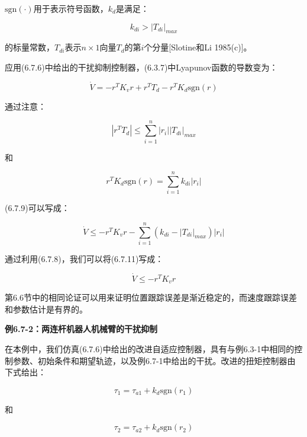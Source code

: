 \documentclass[12pt,a4paper]{ctexart}
\begin{document}
$\text{sgn}(\cdot)$用于表示符号函数，$k_d$是满足：

\begin{equation}\label{eq:kd-condition}
k_{di} > |T_{di}|_{max}
\end{equation}

的标量常数，$T_{di}$表示$n \times 1$向量$T_d$的第$i$个分量[Slotine和Li 1985(c)]。

应用(6.7.6)中给出的干扰抑制控制器，(6.3.7)中Lyapunov函数的导数变为：

\begin{equation}\label{eq:lyapunov-rejection}
\dot{V} = -r^T K_v r + r^T T_d - r^T K_d \text{sgn}(r)
\end{equation}

通过注意：

\begin{equation}\label{eq:signum}
|r^T T_d| \leq \sum_{i=1}^n |r_i||T_{di}|_{max}
\end{equation}

和

\begin{equation}
r^T K_d \text{sgn}(r) = \sum_{i=1}^n k_{di}|r_i|
\end{equation}

(6.7.9)可以写成：

\begin{equation}
\dot{V} \leq -r^T K_v r - \sum_{i=1}^n (k_{di} - |T_{di}|_{max})|r_i|
\end{equation}

通过利用(6.7.8)，我们可以将(6.7.11)写成：

\begin{equation}\label{eq:lyapunov-final}
\dot{V} \leq -r^T K_v r
\end{equation}

第6.6节中的相同论证可以用来证明位置跟踪误差是渐近稳定的，而速度跟踪误差和参数估计是有界的。

\textbf{例6.7-2：两连杆机器人机械臂的干扰抑制}

在本例中，我们仿真(6.7.6)中给出的改进自适应控制器，具有与例6.3-1中相同的控制参数、初始条件和期望轨迹，以及例6.7-1中给出的干扰。改进的扭矩控制器由下式给出：

\begin{equation}
\tau_1 = \tau_{a1} + k_d \text{sgn}(r_1)
\end{equation}

和

\begin{equation}
\tau_2 = \tau_{a2} + k_d \text{sgn}(r_2)
\end{equation}
\end{document}
